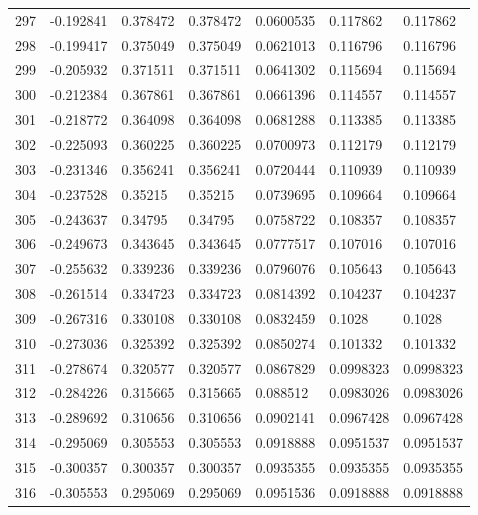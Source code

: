 \begin{longtable}{l|lll|lll}
 297 & -0.192841    & 0.378472    & 0.378472    &  0.0600535   & 0.117862    & 0.117862    \\
 298 & -0.199417    & 0.375049    & 0.375049    &  0.0621013   & 0.116796    & 0.116796    \\
 299 & -0.205932    & 0.371511    & 0.371511    &  0.0641302   & 0.115694    & 0.115694    \\
 300 & -0.212384    & 0.367861    & 0.367861    &  0.0661396   & 0.114557    & 0.114557    \\
 301 & -0.218772    & 0.364098    & 0.364098    &  0.0681288   & 0.113385    & 0.113385    \\
 302 & -0.225093    & 0.360225    & 0.360225    &  0.0700973   & 0.112179    & 0.112179    \\
 303 & -0.231346    & 0.356241    & 0.356241    &  0.0720444   & 0.110939    & 0.110939    \\
 304 & -0.237528    & 0.35215     & 0.35215     &  0.0739695   & 0.109664    & 0.109664    \\
 305 & -0.243637    & 0.34795     & 0.34795     &  0.0758722   & 0.108357    & 0.108357    \\
 306 & -0.249673    & 0.343645    & 0.343645    &  0.0777517   & 0.107016    & 0.107016    \\
 307 & -0.255632    & 0.339236    & 0.339236    &  0.0796076   & 0.105643    & 0.105643    \\
 308 & -0.261514    & 0.334723    & 0.334723    &  0.0814392   & 0.104237    & 0.104237    \\
 309 & -0.267316    & 0.330108    & 0.330108    &  0.0832459   & 0.1028      & 0.1028      \\
 310 & -0.273036    & 0.325392    & 0.325392    &  0.0850274   & 0.101332    & 0.101332    \\
 311 & -0.278674    & 0.320577    & 0.320577    &  0.0867829   & 0.0998323   & 0.0998323   \\
 312 & -0.284226    & 0.315665    & 0.315665    &  0.088512    & 0.0983026   & 0.0983026   \\
 313 & -0.289692    & 0.310656    & 0.310656    &  0.0902141   & 0.0967428   & 0.0967428   \\
 314 & -0.295069    & 0.305553    & 0.305553    &  0.0918888   & 0.0951537   & 0.0951537   \\
 315 & -0.300357    & 0.300357    & 0.300357    &  0.0935355   & 0.0935355   & 0.0935355   \\
 316 & -0.305553    & 0.295069    & 0.295069    &  0.0951536   & 0.0918888   & 0.0918888   \\

\end{longtable}
